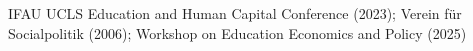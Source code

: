 IFAU UCLS Education and Human Capital Conference (2023); Verein für Socialpolitik (2006); Workshop on Education Economics and Policy (2025)%
